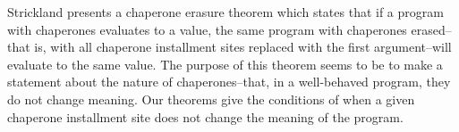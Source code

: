 \documentclass{sigplanconf}
\begin{document}




Strickland presents a chaperone erasure theorem which states that if a program with chaperones evaluates to a value, the same program with chaperones erased--that is, with all chaperone installment sites replaced with the first argument--will evaluate to the same value. The purpose of this theorem seems to be to make a statement about the nature of chaperones--that, in a well-behaved program, they do not change meaning. Our theorems give the conditions of when a given chaperone installment site does not change the meaning of the program.







\end{document}
